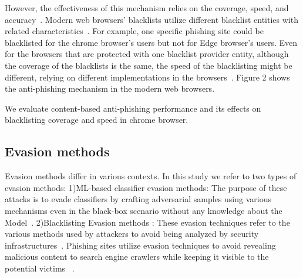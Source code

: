 \documentclass[letterpaper,twocolumn,10pt]{article}
\begin{document}
However, the effectiveness of this mechanism relies on the coverage, speed, and accuracy~\cite{sheng2009empirical}. Modern web browsers' blacklists utilize different blacklist entities with related characteristics~\cite{bell2020analysis}. For example, one specific phishing site could be blacklisted for the chrome browser's users but not for Edge browser's users.
Even for the browsers that are protected with one blacklist provider entity, although the coverage of the blacklists is the same, the speed of the blacklisting might be different, relying on different implementations in the browsers~\cite{oest2019phishfarm}.
Figure 2 shows the anti-phishing mechanism in the modern web browsers. 

We evaluate content-based anti-phishing performance and its effects on blacklisting coverage and speed in chrome browser.

\subsection{Evasion methods}
Evasion methods differ in various contexts. In this study we refer to two types of evasion methods:
1)ML-based classifier evasion methods: The purpose of these attacks is to evade classifiers by crafting adversarial samples using various mechanisms even in the black-box scenario without any knowledge about the Model~\cite{anderson2019adversarial}. 
2)Blacklisting Evasion methods : These evasion techniques refer to the various methods used by attackers to avoid being analyzed by security infrastructures~\cite{egele2008survey}.
Phishing sites utilize evasion techniques to avoid revealing malicious content to search engine crawlers while keeping it visible to the potential victims ~\cite{samarasinghe2020cloaking, invernizzi2016cloak,panum2020towards}. 
\end{document}

